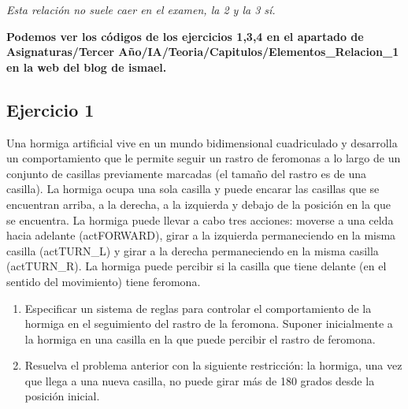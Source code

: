 \begin{tcolorbox}[colback=green!5!white, colframe=green!75!black]
\textit{Esta relación no suele caer en el examen, la 2 y la 3 sí.}
\end{tcolorbox}

\textbf{Podemos ver los códigos de los ejercicios 1,3,4 en el apartado de Asignaturas/Tercer Año/IA/Teoria/Capitulos/Elementos\_Relacion\_1 en la web del blog de ismael.}

\subsection*{Ejercicio 1}

Una hormiga artificial vive en un mundo bidimensional cuadriculado y desarrolla un 
comportamiento  que  le  permite  seguir  un  rastro  de  feromonas  a  lo  largo  de  un  conjunto  de 
casillas  previamente  marcadas  (el  tamaño  del  rastro  es  de  una  casilla).  La  hormiga  ocupa  una 
sola casilla y puede encarar las casillas que se encuentran arriba, a la derecha, a la izquierda y 
debajo  de  la  posición  en  la  que  se  encuentra.  La  hormiga  puede  llevar  a  cabo  tres  acciones: 
moverse a una celda hacia adelante (actFORWARD), girar a la izquierda permaneciendo en la 
misma casilla (actTURN\_L) y girar a la derecha permaneciendo en la misma casilla 
(actTURN\_R).  La  hormiga  puede  percibir  si  la  casilla  que  tiene  delante  (en  el  sentido  del 
movimiento) tiene feromona.

\begin{enumerate}
    \item Especificar  un  sistema  de  reglas  para  controlar  el  comportamiento  de  la  hormiga  en  el 
    seguimiento del rastro de la feromona. Suponer inicialmente a la hormiga en una casilla en 
    la que puede percibir el rastro de feromona.
    \item Resuelva el problema anterior con la siguiente restricción: la hormiga, una vez que llega a 
    una nueva casilla, no puede girar más de 180 grados desde la posición inicial.
\end{enumerate}

